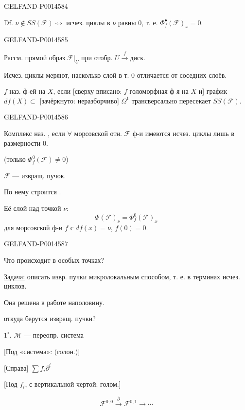 \begin{GelfandAdjacentEvidence}{GELFAND-P001458}{4}


\uline{Df.} \(\nu\notin SS(\mathcal F)\Longleftrightarrow\)
исчез. циклы в \(\nu\) равны \(0\), т. е. \(\Phi_f^\bullet(\mathcal F)_x=0\).
\end{GelfandAdjacentEvidence}
\begin{GelfandAdjacentEvidence}{GELFAND-P001458}{5}


Рассм. прямой образ \(\mathcal F|_U\) при отобр. \(U\overset{f}{\longrightarrow}\text{диск}\).

Исчез. циклы меряют, насколько слой в т. 0 отличается от соседних слоёв.

\(f\) наз.  ф-ей на \(X\), если
[сверху вписано: \(f\) голоморфная ф-я на \(X\) и] график \(df(X)\subset\) [зачёркнуто: неразборчиво] \(\Omega^1\)
трансверсально пересекает \(SS(\mathcal F)\).
\end{GelfandAdjacentEvidence}
\begin{GelfandAdjacentEvidence}{GELFAND-P001458}{6}


Комплекс наз. , если \(\forall\) морсовской отн. \(\mathcal F\) ф-и имеются исчез. циклы лишь в размерности 0.

(только \(\Phi_f^0(\mathcal F)\ne0\))

\(\mathcal F\) — извращ. пучок.

По нему строится .

Её слой над точкой \(\nu\):
\[
\Phi(\mathcal F)_\nu=\Phi_f^0(\mathcal F)_x
\]
для морсовской ф-и \(f\) с \(df(x)=\nu\), \(f(0)=0\).
\end{GelfandAdjacentEvidence}
\begin{GelfandAdjacentEvidence}{GELFAND-P001458}{7}


Что происходит в особых точках?

\uline{Задача:} описать извр. пучки микролокальным способом, т. е. в терминах исчез. циклов.

Она решена в работе наполовину.

 откуда берутся извращ. пучки?

\(1^\circ\). \(\mathcal M\) — переопр. система

[Под «система»: (голон.)]

[Справа] \(\sum f_i\partial^i\)

[Под \(f_i\), с вертикальной чертой: голом.]

\[
\mathcal F^{0,0}\overset{\bar\partial}{\longrightarrow}\mathcal F^{0,1}\longrightarrow\cdots
\]

\end{GelfandAdjacentEvidence}


